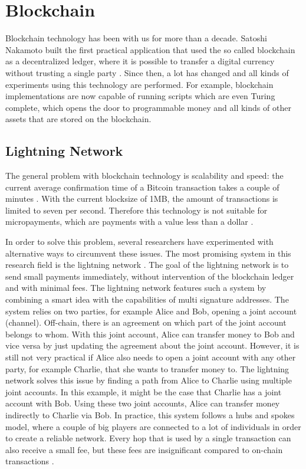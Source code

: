 \section{Blockchain}

Blockchain technology has been with us for more than a decade. Satoshi Nakamoto built the first practical application that used the so called blockchain as a decentralized ledger, where it is possible to transfer a digital currency without trusting a single party \cite{nakamoto2019bitcoin}. Since then, a lot has changed and all kinds of experiments using this technology are performed. For example, blockchain implementations are now capable of running scripts which are even Turing complete, which opens the door to programmable money \cite{wood2014ethereum} and all kinds of other assets that are stored on the blockchain. 


\subsection{Lightning Network}
The general problem with blockchain technology is scalability and speed: the current average confirmation time of a Bitcoin transaction takes a couple of minutes \cite{bamert2013have}. With the current blocksize of 1MB, the amount of transactions is limited to seven per second. Therefore this technology is not suitable for micropayments, which are payments with a value less than a dollar \cite{definitionmicropayment}.

In order to solve this problem, several researchers have experimented with alternative ways to circumvent these issues. The most promising system in this research field is the lightning network \cite{poon2016bitcoin}. The goal of the lightning network is to send small payments immediately, without intervention of the blockchain ledger and with minimal fees. The lightning network features such a system by combining a smart idea with the capabilities of multi signature addresses. The system relies on two parties, for example Alice and Bob, opening a joint account (channel). Off-chain, there is an agreement on which part of the joint account belongs to whom. With this joint account, Alice can transfer money to Bob and vice versa by just updating the agreement about the joint account. However, it is still not very practical if Alice also needs to open a joint account with any other party, for example Charlie, that she wants to transfer money to. The lightning network solves this issue by finding a path from Alice to Charlie using multiple joint accounts. In this example, it might be the case that Charlie has a joint account with Bob. Using these two joint accounts, Alice can transfer money indirectly to Charlie via Bob. In practice, this system follows a hubs and spokes model, where a couple of big players are connected to a lot of individuals in order to create a reliable network. Every hop that is used by a single transaction can also receive a small fee, but these fees are insignificant compared to on-chain transactions \cite{poon2016bitcoin}.


